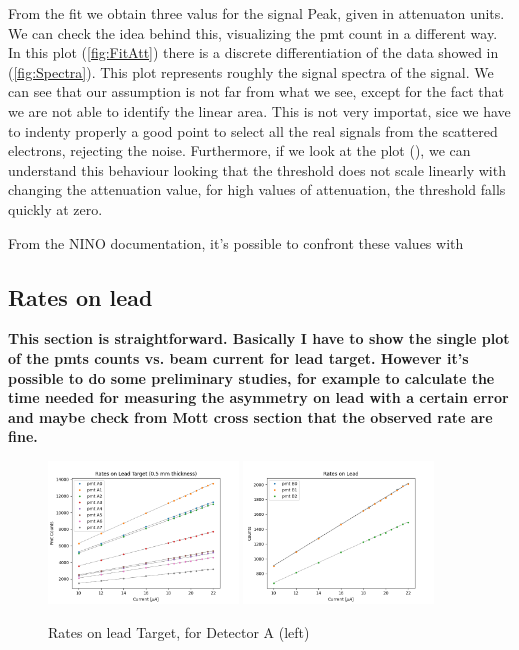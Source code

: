 From the fit we obtain three valus for the signal Peak, given in attenuaton units.
We can check the idea behind this, visualizing the pmt count in a different way. In this plot (\ref{fig:FitAtt}) there is a discrete differentiation of the data showed in (\ref{fig:Spectra}). This plot represents roughly the signal spectra of the signal. 
We can see that our assumption is not far from what we see, except for the fact that we are not able to identify the linear area. This is not very importat, sice we have to indenty properly a good point to select all the real signals from the scattered electrons, rejecting the noise. Furthermore, if we look at the plot (), we can understand this behaviour looking that the threshold does not scale linearly with changing the attenuation value, for high values of attenuation, the threshold falls quickly at zero.

 
From the NINO documentation, it's possible to confront these values with 

\newpage

\subsection{Rates on lead}

{\bfseries This section is straightforward. Basically I have to show the single plot of the pmts counts vs. beam current for lead target. However it's possible to do some preliminary studies, for example to calculate the time needed for measuring the asymmetry on lead with a certain error and maybe check from Mott cross section that the observed rate are fine.}

\begin{figure}[hbtp]
\centering
\includegraphics[width = 0.45\textwidth]{Analysis/Rates_on_lead.png}
\includegraphics[width = 0.45\textwidth]{Analysis/Rates_on_leadB.png}
\caption{Rates on lead Target, for Detector A (left)}
\end{figure}

